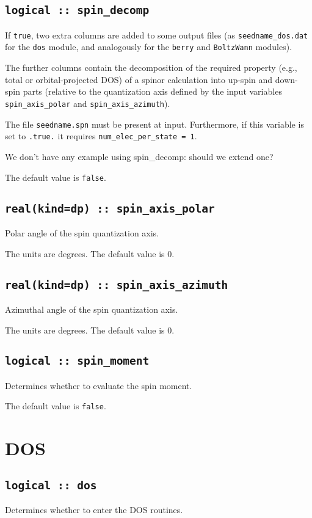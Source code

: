 \subsection[spin\_decomp]{\tt logical :: spin\_decomp}
If {\tt true}, two extra columns are added to some output files (as
{\tt seedname\_dos.dat} for the {\tt dos} module, and analogously for
the {\tt berry} and {\tt BoltzWann} modules).

The further columns contain the decomposition of the required property
(e.g., total or orbital-projected DOS)
of a spinor calculation into up-spin and down-spin parts (relative to
the quantization axis defined by the input variables {\tt
  spin\_axis\_polar} and {\tt spin\_axis\_azimuth}). 

The file {\tt seedname.spn} must be present at input. Furthermore, if
this variable is set to \verb#.true.# it
requires {\tt num\_elec\_per\_state = 1}.

{\color{red} We don't have any example using spin\_decomp: should we
  extend one?}

The default value is \verb#false#.

  \subsection{\tt real(kind=dp) :: spin\_axis\_polar}
Polar angle of the spin quantization axis.

The units are degrees. The default value is 0.

\subsection{\tt real(kind=dp) :: spin\_axis\_azimuth}
Azimuthal angle of the spin quantization axis. 

The units are degrees. The default value is 0.

\subsection[spin\_moment]{\tt logical :: spin\_moment}
Determines whether to evaluate the spin moment.

The default value is \verb#false#.


\clearpage
\section{DOS}
\subsection[dos]{\tt logical :: dos}
Determines whether to enter the DOS routines.

